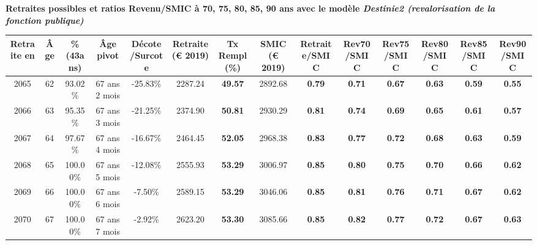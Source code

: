  \vspace{0.1cm} 
{\bf \noindent Retraites possibles et ratios Revenu/SMIC à 70, 75, 80, 85, 90 ans avec le modèle \emph{Destinie2 (revalorisation de la fonction publique)}}  
 
\begin{adjustbox}{max width=\textwidth} 
\begin{tabular}[htb]{|c|c||c|c|c||c|c||c||c|c|c|c|c|c|} 
\hline 
 Retraite en &  Âge &  \%(43ans) &  Âge pivot &  Décote/Surcote &  Retraite (\euro{} 2019) &  Tx Rempl(\%) &  SMIC (\euro{} 2019) &  Retraite/SMIC &  Rev70/SMIC &  Rev75/SMIC &  Rev80/SMIC &  Rev85/SMIC &  Rev90/SMIC \\ 
\hline \hline 
 2065 &  62 &  93.02\% &  67 ans 2 mois &  -25.83\% &  2287.24 &  {\bf 49.57} &  2892.68 &  {\bf {\color{red} 0.79}} &  {\bf {\color{red} 0.71}} &  {\bf {\color{red} 0.67}} &  {\bf {\color{red} 0.63}} &  {\bf {\color{red} 0.59}} &  {\bf {\color{red} 0.55}} \\ 
\hline 
 2066 &  63 &  95.35\% &  67 ans 3 mois &  -21.25\% &  2374.90 &  {\bf 50.81} &  2930.29 &  {\bf {\color{red} 0.81}} &  {\bf {\color{red} 0.74}} &  {\bf {\color{red} 0.69}} &  {\bf {\color{red} 0.65}} &  {\bf {\color{red} 0.61}} &  {\bf {\color{red} 0.57}} \\ 
\hline 
 2067 &  64 &  97.67\% &  67 ans 4 mois &  -16.67\% &  2464.45 &  {\bf 52.05} &  2968.38 &  {\bf {\color{red} 0.83}} &  {\bf {\color{red} 0.77}} &  {\bf {\color{red} 0.72}} &  {\bf {\color{red} 0.68}} &  {\bf {\color{red} 0.63}} &  {\bf {\color{red} 0.59}} \\ 
\hline 
 2068 &  65 &  100.00\% &  67 ans 5 mois &  -12.08\% &  2555.93 &  {\bf 53.29} &  3006.97 &  {\bf {\color{red} 0.85}} &  {\bf {\color{red} 0.80}} &  {\bf {\color{red} 0.75}} &  {\bf {\color{red} 0.70}} &  {\bf {\color{red} 0.66}} &  {\bf {\color{red} 0.62}} \\ 
\hline 
 2069 &  66 &  100.00\% &  67 ans 6 mois &  -7.50\% &  2589.15 &  {\bf 53.29} &  3046.06 &  {\bf {\color{red} 0.85}} &  {\bf {\color{red} 0.81}} &  {\bf {\color{red} 0.76}} &  {\bf {\color{red} 0.71}} &  {\bf {\color{red} 0.67}} &  {\bf {\color{red} 0.62}} \\ 
\hline 
 2070 &  67 &  100.00\% &  67 ans 7 mois &  -2.92\% &  2623.20 &  {\bf 53.30} &  3085.66 &  {\bf {\color{red} 0.85}} &  {\bf {\color{red} 0.82}} &  {\bf {\color{red} 0.77}} &  {\bf {\color{red} 0.72}} &  {\bf {\color{red} 0.67}} &  {\bf {\color{red} 0.63}} \\ 
\hline 
\hline 
\end{tabular} 
\end{adjustbox} 
 
